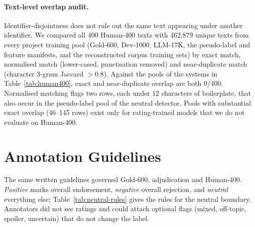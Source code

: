 \paragraph{Text-level overlap audit.}
Identifier-disjointness does not rule out the same text appearing
under another identifier. We compared all 400 Human-400 texts with
462{,}879 unique texts from every project training pool (Gold-600,
Dev-1000, LLM-17K, the pseudo-label and feature manifests, and the
reconstructed corpus training sets) by exact match, normalised match
(lower-cased, punctuation removed) and near-duplicate match
(character 3-gram Jaccard $>0.8$). Against the pools of the systems
in Table~\ref{tab:human400}, exact and near-duplicate overlap are
both 0/400. Normalised matching flags two rows, each under 12
characters of boilerplate, that also occur in the pseudo-label pool
of the neutral detector. Pools with substantial exact overlap
(46--145 rows) exist only for rating-trained models that we do not
evaluate on Human-400.

\section{Annotation Guidelines}
\label{app:annotation}

The same written guidelines governed Gold-600, adjudication and
Human-400. \emph{Positive} marks overall endorsement,
\emph{negative} overall rejection, and \emph{neutral} everything
else; Table~\ref{tab:neutral-rules} gives the rules for the neutral
boundary. Annotators did not see ratings and could attach optional
flags (mixed, off-topic, spoiler, uncertain) that do not change the
label.

